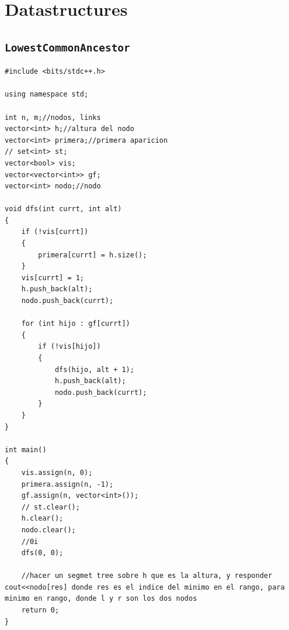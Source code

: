 \section{Datastructures}

\subsection{\texttt{LowestCommonAncestor}}
\begin{lstlisting}
#include <bits/stdc++.h>

using namespace std;

int n, m;//nodos, links
vector<int> h;//altura del nodo
vector<int> primera;//primera aparicion
// set<int> st;
vector<bool> vis;
vector<vector<int>> gf;
vector<int> nodo;//nodo 

void dfs(int currt, int alt)
{
    if (!vis[currt])
    {
        primera[currt] = h.size();
    }
    vis[currt] = 1;
    h.push_back(alt);
    nodo.push_back(currt);

    for (int hijo : gf[currt])
    {
        if (!vis[hijo])
        {
            dfs(hijo, alt + 1);
            h.push_back(alt);
            nodo.push_back(currt);
        }
    }
}

int main()
{
    vis.assign(n, 0);
    primera.assign(n, -1);
    gf.assign(n, vector<int>());
    // st.clear();
    h.clear();
    nodo.clear();
    //0i
    dfs(0, 0);

    //hacer un segmet tree sobre h que es la altura, y responder cout<<nodo[res] donde res es el indice del minimo en el rango, para minimo en rango, donde l y r son los dos nodos
    return 0;
}\end{lstlisting}

